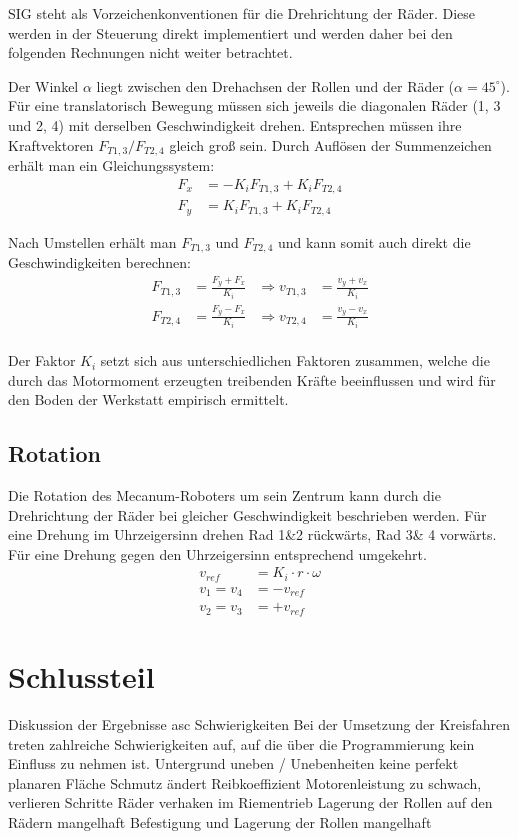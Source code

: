 \documentclass[a4paper]{article}
\begin{document}
SIG steht als Vorzeichenkonventionen für die Drehrichtung der Räder. Diese werden in der Steuerung direkt implementiert und werden daher bei den folgenden Rechnungen nicht weiter betrachtet.

Der Winkel $ \alpha $ liegt zwischen den Drehachsen der Rollen und der Räder ($\alpha = 45^\circ$).
Für eine translatorisch Bewegung müssen sich jeweils die diagonalen Räder (1, 3 und 2, 4) mit derselben Geschwindigkeit drehen. Entsprechen müssen ihre Kraftvektoren $F_{T1, 3} / F_{T2, 4}$ gleich groß sein.
Durch Auflösen der Summenzeichen erhält man ein Gleichungssystem:
\begin{align*}
F_x &= - K_i F_{T1, 3} + K_i F_{T2, 4} \\
F_y &= K_i F_{T1, 3}   + K_i F_{T2, 4}
\end{align*}

Nach Umstellen erhält man $F_{T1, 3}$ und $F_{T2, 4}$ und kann somit auch direkt die Geschwindigkeiten berechnen:
\begin{align*}
F_{T1, 3} &= \frac{F_y + F_x}{K_i} &\Rightarrow v_{T1, 3} &= \frac{v_y + v_x}{K_i}\\
F_{T2, 4} &= \frac{F_y - F_x}{K_i} &\Rightarrow v_{T2, 4} &= \frac{v_y - v_x}{K_i}\\
\end{align*}

Der Faktor $K_i$ setzt sich aus unterschiedlichen Faktoren zusammen, welche die durch das Motormoment erzeugten treibenden Kräfte beeinflussen und wird für den Boden der Werkstatt empirisch ermittelt.


\subsection{Rotation}
Die Rotation des Mecanum-Roboters um sein Zentrum kann durch die Drehrichtung der Räder bei gleicher Geschwindigkeit beschrieben werden.
Für eine Drehung im Uhrzeigersinn drehen Rad 1\&2 rückwärts, Rad 3\& 4 vorwärts. Für eine Drehung gegen den Uhrzeigersinn entsprechend umgekehrt.
\begin{align*}
v_{ref} &= K_i \cdot r \cdot \omega \\
v_1 = v_4 &= - v_{ref} \\
v_2 = v_3 &= + v_{ref}
\end{align*}


\section{Schlussteil}
Diskussion der Ergebnisse
asc
Schwierigkeiten
Bei der Umsetzung der Kreisfahren treten zahlreiche Schwierigkeiten auf, auf die über die Programmierung kein Einfluss zu nehmen ist.
Untergrund uneben / Unebenheiten
keine perfekt planaren Fläche
Schmutz ändert Reibkoeffizient
Motorenleistung zu schwach, verlieren Schritte
Räder verhaken im Riementrieb
Lagerung der Rollen auf den Rädern mangelhaft
Befestigung und Lagerung der Rollen mangelhaft
\end{document}
